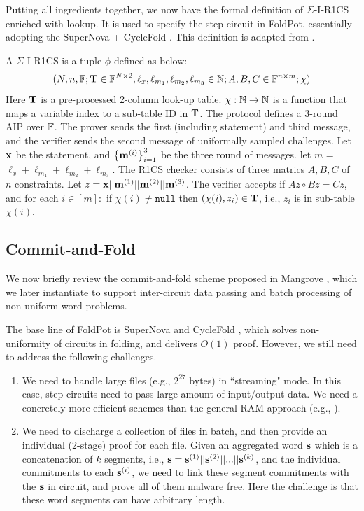 Putting all ingredients together, we now have the formal
definition of $\Sigma$-I-R1CS enriched with lookup. It is
used to specify the step-circuit in FoldPot, essentially
adopting the SuperNova \cite{SuperNova} + CycleFold \cite{CycleFold}.
This definition is adapted from \cite[Definition 1]{AIPRam}.

\begin{definition} \label{deff:ir1cs}  
A $\Sigma$-I-R1CS is a tuple $\phi$ defined
as below:
\[
(N, n, \mathbb{F}; {{\mathbf {T}}} \in \mathbb{F}^{N\times 2}, 
\ell_x, \ell_{m_1}, \ell_{m_2}, \ell_{m_3} \in \mathbb{N}; 
A,B,C \in \mathbb{F}^{n\times m}; \chi)
\]
Here ${{\mathbf {T}}}$ is a pre-processed 2-column look-up table.
$\chi: \mathbb{N} \rightarrow \mathbb{N}$ is a function that maps
a variable index to a sub-table ID in ${{\mathbf {T}}}$.
The protocol 
defines a 3-round AIP over $\mathbb{F}$. The prover sends the first (including
statement) and third message, and the verifier sends
the second message of uniformally sampled challenges.
Let ${{\mathbf {x}}}$ be the statement, and $\big\{{{\mathbf {m}}}^{(i)}\big\}_{i=1}^{3}$
be the three round of messages.
let $m$ = $\ell_x + \ell_{m_1} + \ell_{m_2} + \ell_{m_3}$.
The R1CS checker consists of three matrics $A, B, C$ of $n$ constraints.
Let $z = {{\mathbf {x}}} || {{\mathbf {m}}}^{(1)} || {{\mathbf {m}}}^{(2)}
	|| {{\mathbf {m}}}^{(3)}$. 
The verifier accepts if $Az \circ Bz = Cz$, and
for each $i\in [m]:$ if $\chi(i) \neq \texttt{null}$ then
$(\chi(i), z_i) \in {{\mathbf {T}}}$, i.e.,
$z_i$ is in sub-table $\chi(i)$.
\end{definition}

\subsection{Commit-and-Fold}
\label{cf_zksnark}
We now briefly review the commit-and-fold scheme proposed in
Mangrove \cite{Mangrove}, which we later instantiate to support
inter-circuit data passing and batch processing of non-uniform word
problems.

The base line of FoldPot is SuperNova \cite{SuperNova} and 
CycleFold \cite{CycleFold}, which solves non-uniformity of 
circuits in folding, and delivers
$O(1)$ proof. However, we still need to address the following challenges.

\begin{enumerate}
\item We need to handle large files (e.g., $2^{27}$ bytes) in
``streaming" mode. In this case, step-circuits need to pass
large amount of input/output data. We need a concretely
more efficient schemes than the general RAM approach (e.g., \cite{AIPRam}).

\item We need to discharge a collection of files in batch, and
then provide an individual (2-stage) proof for each file.
Given an aggregated word ${{\mathbf {s}}}$ which is a concatenation
of $k$ segments, i.e.,
${{\mathbf {s}}} = {{\mathbf {s}}}^{(1)} || {{\mathbf {s}}}^{(2)} || ... || {{\mathbf {s}}}^{(k)}$, and the individual commitments to each ${{\mathbf {s}}}^{(i)}$,
we need to link these segment commitments with the ${{\mathbf {s}}}$ in circuit,
and prove all of them malware free. Here the challenge is that
these word segments can have arbitrary length.
\end{enumerate}

